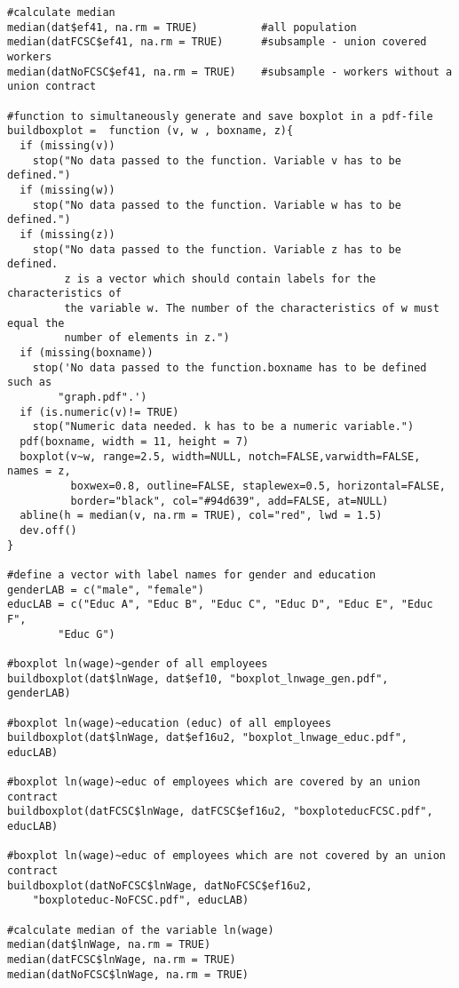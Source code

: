 \begin{lstlisting}
#calculate median
median(dat$ef41, na.rm = TRUE)          #all population
median(datFCSC$ef41, na.rm = TRUE)      #subsample - union covered workers
median(datNoFCSC$ef41, na.rm = TRUE)    #subsample - workers without a union contract

#function to simultaneously generate and save boxplot in a pdf-file
buildboxplot =  function (v, w , boxname, z){
  if (missing(v))
    stop("No data passed to the function. Variable v has to be defined.")
  if (missing(w))
    stop("No data passed to the function. Variable w has to be defined.")
  if (missing(z))
    stop("No data passed to the function. Variable z has to be defined.
         z is a vector which should contain labels for the characteristics of 
         the variable w. The number of the characteristics of w must equal the 
         number of elements in z.")
  if (missing(boxname))
    stop('No data passed to the function.boxname has to be defined such as 
    	"graph.pdf".') 
  if (is.numeric(v)!= TRUE)
    stop("Numeric data needed. k has to be a numeric variable.")
  pdf(boxname, width = 11, height = 7)
  boxplot(v~w, range=2.5, width=NULL, notch=FALSE,varwidth=FALSE, names = z,
          boxwex=0.8, outline=FALSE, staplewex=0.5, horizontal=FALSE, 
          border="black", col="#94d639", add=FALSE, at=NULL)          
  abline(h = median(v, na.rm = TRUE), col="red", lwd = 1.5)
  dev.off()
}

#define a vector with label names for gender and education
genderLAB = c("male", "female")
educLAB = c("Educ A", "Educ B", "Educ C", "Educ D", "Educ E", "Educ F", 
		"Educ G")

#boxplot ln(wage)~gender of all employees
buildboxplot(dat$lnWage, dat$ef10, "boxplot_lnwage_gen.pdf", genderLAB)

#boxplot ln(wage)~education (educ) of all employees 
buildboxplot(dat$lnWage, dat$ef16u2, "boxplot_lnwage_educ.pdf", educLAB)

#boxplot ln(wage)~educ of employees which are covered by an union contract 
buildboxplot(datFCSC$lnWage, datFCSC$ef16u2, "boxploteducFCSC.pdf", educLAB)

#boxplot ln(wage)~educ of employees which are not covered by an union contract
buildboxplot(datNoFCSC$lnWage, datNoFCSC$ef16u2, 
	"boxploteduc-NoFCSC.pdf", educLAB)

#calculate median of the variable ln(wage)
median(dat$lnWage, na.rm = TRUE)
median(datFCSC$lnWage, na.rm = TRUE)
median(datNoFCSC$lnWage, na.rm = TRUE)
\end{lstlisting}

